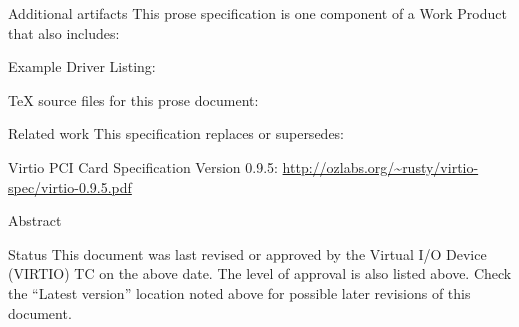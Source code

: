 \begin{titlepage}
\begin{oasistitlesection}{Additional artifacts}
This prose specification is one component of a Work Product that also includes:
\begin{itemize*}
	\item Example Driver Listing: \newline
	\virtiourllistings
	\item TeX source files for this prose document:\newline
	\virtiourltex
\end{itemize*}
\end{oasistitlesection}
\vspace{-0.2in}

\begin{oasistitlesection}{Related work}
This specification replaces or supersedes:
\begin{itemize*}
	\item Virtio PCI Card Specification Version 0.9.5:\newline
	\url{http://ozlabs.org/~rusty/virtio-spec/virtio-0.9.5.pdf}
\end{itemize*}
\end{oasistitlesection}
\vspace{-0.2in}

\vfill\newpage

\begin{oasistitlesection}{Abstract}

\end{oasistitlesection}

\begin{oasistitlesection}{Status}
This document was last revised or approved by the Virtual I/O Device
(VIRTIO) TC on the above date. The level of approval is also listed above. Check the ``Latest version'' location noted above for possible later revisions of this document.


\end{oasistitlesection}
\end{titlepage}
